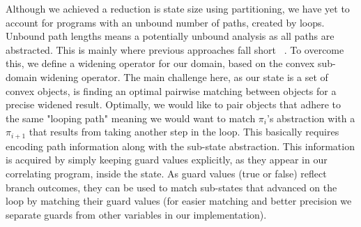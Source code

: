 

Although we achieved a reduction is state size using partitioning, we have yet to account for programs with an unbound number of paths, created by loops. Unbound path lengths means a potentially unbound analysis as all paths are abstracted. This is mainly where previous approaches fall short ~\cite{}. To overcome this, we define a widening operator for our domain, based on the convex sub-domain widening operator. The main challenge here, as our state is a set of convex objects, is finding an optimal pairwise matching between objects for a precise widened result. Optimally, we would like to pair objects that adhere to the same "looping path" meaning we would want to match $\pi_i$'s abstraction with a $\pi_{i+1}$ that results from taking another step in the loop. This basically requires encoding path information along with the sub-state abstraction. This information is acquired by simply keeping guard values explicitly, as they appear in our correlating program, inside the state. As guard values (true or false) reflect branch outcomes, they can be used to match sub-states that advanced on the loop by matching their guard values (for easier matching and better precision we separate guards from other variables in our implementation).




